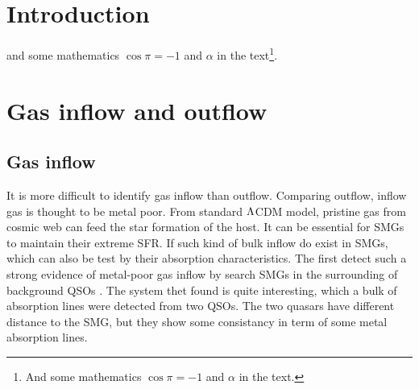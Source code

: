 \documentclass{astronotes/astronotes} %
\affiliation{\textsuperscript{1}\textit{European Sourthern Observatory, Garching, Germany}} %
\affiliation{*\textbf{Email}: cjhastro@gmail.com} %
\begin{document}
\maketitle %

\tableofcontents %

\thispagestyle{empty} %


\section{Introduction} %

\lipsum[1-3] %
 and some mathematics $\cos\pi=-1$ and $\alpha$ in the text\footnote{And some mathematics $\cos\pi=-1$ and $\alpha$ in the text.}.


\section{Gas inflow and outflow}
\subsection{Gas inflow}
It is more difficult to identify gas inflow than outflow.
Comparing outflow, inflow gas is thought to be metal poor.
From standard ${\rm \Lambda}$CDM model, pristine gas from cosmic web can feed the star formation of the host.
It can be essential for SMGs to maintain their extreme SFR.
If such kind of bulk inflow do exist in SMGs, which can also be test by their absorption characteristics.
The first detect such a strong evidence of metal-poor gas inflow by search SMGs in the surrounding of background QSOs \citep{Fu2021a}.
The system thet found is quite interesting, which a bulk of absorption lines were detected from two QSOs.
The two quasars have different distance to the SMG, but they show some consistancy in term of some metal absorption lines.
\end{document}
